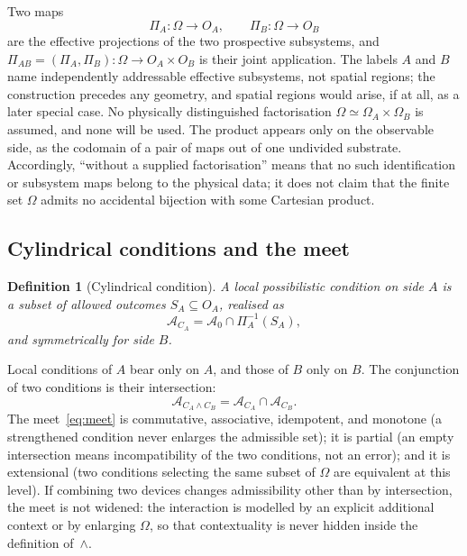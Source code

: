 \documentclass[11pt,a4paper]{article}
\newtheorem{definition}[theorem]{Definition}
\newcommand{\Om}{\Omega}
\newcommand{\Aref}{\mathcal{A}_0}
\newcommand{\AC}[1]{\mathcal{A}_{#1}}
\newcommand{\OA}{O_A}
\newcommand{\OB}{O_B}
\newcommand{\PiA}{\Pi_A}
\newcommand{\PiB}{\Pi_B}
\newcommand{\PiAB}{\Pi_{AB}}
\begin{document}
    Two maps
    \begin{equation}
      \PiA \colon \Om \to \OA,
      \qquad
      \PiB \colon \Om \to \OB
    \end{equation}
    are the effective projections of the two prospective subsystems, and
    $\PiAB = (\PiA, \PiB) \colon \Om \to \OA \times \OB$ is their joint application.
    The labels $A$ and $B$ name independently addressable effective subsystems, not spatial regions; the
    construction precedes any geometry, and spatial regions would arise, if at all, as a later special case.
    No physically distinguished factorisation $\Om \simeq \Om_A \times \Om_B$ is assumed, and none will be
    used.
    The product appears only on the observable side, as the codomain of a pair of maps out of one undivided
    substrate.
    Accordingly, ``without a supplied factorisation'' means that no such identification or subsystem maps
    belong to the physical data; it does not claim that the finite set $\Om$ admits no accidental bijection
    with some Cartesian product.

  \subsection{Cylindrical conditions and the meet}
    \label{ssec:conditions}

    \begin{definition}[Cylindrical condition]
      \label{def:cylindrical}
      A local possibilistic condition on side $A$ is a subset of allowed outcomes $S_A \subseteq \OA$,
      realised as
      \begin{equation}
        \AC{C_A} = \Aref \cap \PiA^{-1}(S_A),
      \end{equation}
      and symmetrically for side $B$.
    \end{definition}

    Local conditions of $A$ bear only on $A$, and those of $B$ only on $B$.
    The conjunction of two conditions is their intersection:
    \begin{equation}
      \label{eq:meet}
      \AC{C_A \wedge C_B} = \AC{C_A} \cap \AC{C_B}.
    \end{equation}
    The meet~\eqref{eq:meet} is commutative, associative, idempotent, and monotone (a strengthened condition
    never enlarges the admissible set); it is partial (an empty intersection means incompatibility of the
    two conditions, not an error); and it is extensional (two conditions selecting the same subset of $\Om$
    are equivalent at this level).
    If combining two devices changes admissibility other than by intersection, the meet is not widened:
    the interaction is modelled by an explicit additional context or by enlarging $\Om$, so that
    contextuality is never hidden inside the definition of~$\wedge$.
\end{document}
